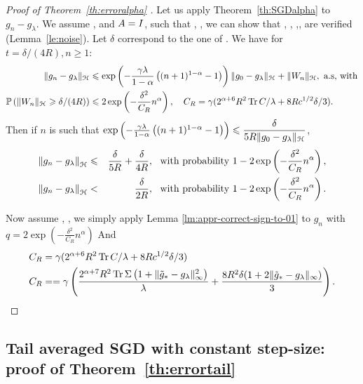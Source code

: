\begin{proof}[Proof of Theorem~\ref{th:erroralpha} ]

Let us apply Theorem~\ref{th:SGDalpha} to $g_n - g_\lambda$. We assume ,  and $A = I$, such that , , we can show that , , ,,  are verified (Lemma~\ref{le:noise}). Let $\delta$ correspond to the one of .
 We have for $t = \delta/(4R), n \geqslant 1$:   
\begin{align*}
\|g_n - g_\lambda\|_{\mathcal H} &\leqslant \exp\left(  -\frac{\gamma\lambda}{1-\alpha}\left( (n+1)^{1-\alpha} -1  \right)   \right) \|g_0 - g_\lambda\|_{\mathcal H} + \|W_n\|_{\mathcal H},\ \text{a.s, with}\\
{\mathbb P} \left( \|W_n\|_{\mathcal H} \geqslant \delta/(4R) \right) &\leqslant 2\exp\left( -\frac{\delta^2}{C_R } n^{\alpha}\right), \quad C_R = \displaystyle  \gamma(2 ^{\alpha + 6} R^2 \operatorname{Tr} C/\lambda+ 8 R c^{1/2} \delta /3).
\end{align*}
Then if $n$ is such that $\exp\left(  -\frac{\gamma\lambda}{1-\alpha}\left( (n+1)^{1-\alpha} -1  \right)   \right) \leqslant \displaystyle \frac{\delta} {5R\|g_0- g_\lambda\|_{\mathcal H}}$, 
\begin{eqnarray*}
\left\|g_n - g_\lambda \right\|_\H &\leqslant& \frac{\delta}{5R} + \frac{\delta}{4R},\ \text{ with probability } 1-2\exp\left( -\frac{\delta^2}{C_R } n^{\alpha}\right), \\
\left\|g_n - g_\lambda \right\|_\H &<& \frac{\delta}{2R},\ \text{ with probability } 1-2\exp\left( -\frac{\delta^2}{C_R } n^{\alpha}\right).
\end{eqnarray*}

Now assume , , we simply apply Lemma \ref{lm:appr-correct-sign-to-01} to $g_n$ with $q = 2\exp\left( -\frac{\delta^2}{C_R } n^{\alpha}\right)$ And 
\begin{align*}
C_R &= \gamma(2 ^{\alpha + 6} R^2 \operatorname{Tr} C/\lambda  + 8 R c^{1/2}\delta /3) \\ 
C_R &= = \gamma\left(\frac{2 ^{\alpha + 7} R^2 \operatorname{Tr} \Sigma  \left(1+\|\tilde{g}_*- g_\lambda\|^2_\infty\right)}{\lambda}+\frac{8R^2 \delta( 1 + 2 \| \tilde{g}_* - g_\lambda\|_\infty )}{3}\right).
\end{align*}

\end{proof}


\subsection{Tail averaged SGD with constant step-size: proof of Theorem~\ref{th:errortail} }
\label{ap:EXPaverage}


